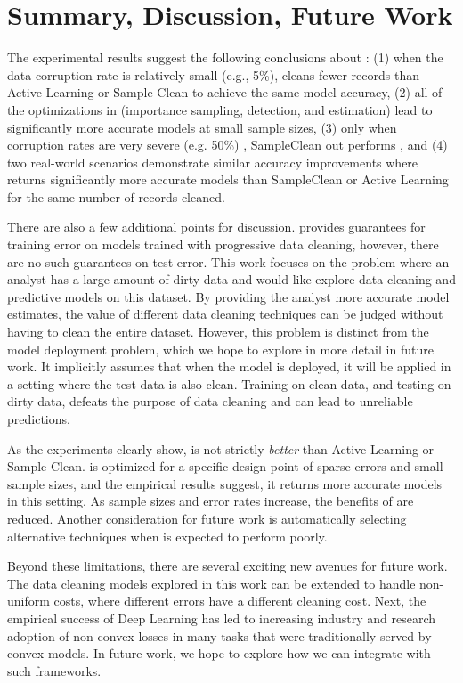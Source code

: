 \section{Summary, Discussion, Future Work}
The experimental results suggest the following conclusions about \sys: (1) when the data corruption rate is relatively small (e.g., 5\%), \sys cleans fewer records than Active Learning or Sample Clean to achieve the same model accuracy, (2) all of the optimizations in \sys (importance sampling, detection, and estimation) lead to significantly more accurate models at small sample sizes, (3) only when corruption rates are very severe (e.g. 50\%) , SampleClean out performs \sys, and (4) two real-world scenarios demonstrate similar accuracy improvements where \sys returns significantly more accurate models than SampleClean or Active Learning for the same number of records cleaned.

There are also a few additional points for discussion.
\sys provides guarantees for training error on models trained with progressive data cleaning, however, there are no such guarantees on test error. 
This work focuses on the problem where an analyst has a large amount of dirty data and would like explore data cleaning and predictive models on this dataset.
By providing the analyst more accurate model estimates, the value of different data cleaning techniques can be judged without having to clean the entire dataset.
However, this problem is distinct from the model deployment problem, which we hope to explore in more detail in future work.
It implicitly assumes that when the model is deployed, it will be applied in a setting where the test data is also clean.
Training on clean data, and testing on dirty data, defeats the purpose of data cleaning and can lead to unreliable predictions.

As the experiments clearly show, \sys is not strictly \emph{better} than Active Learning or Sample Clean.
\sys is optimized for a specific design point of sparse errors and small sample sizes, and the empirical results suggest, it returns more accurate models in this setting.
As sample sizes and error rates increase, the benefits of \sys are reduced.
Another consideration for future work is automatically selecting alternative techniques when \sys is expected to perform poorly.

Beyond these limitations, there are several exciting new avenues for future work.
The data cleaning models explored in this work can be extended to handle non-uniform costs, where different errors have a different cleaning cost.
Next, the empirical success of Deep Learning has led to increasing industry and research adoption of non-convex losses in many tasks that were traditionally served by convex models.
In future work, we hope to explore how we can integrate with such frameworks.

